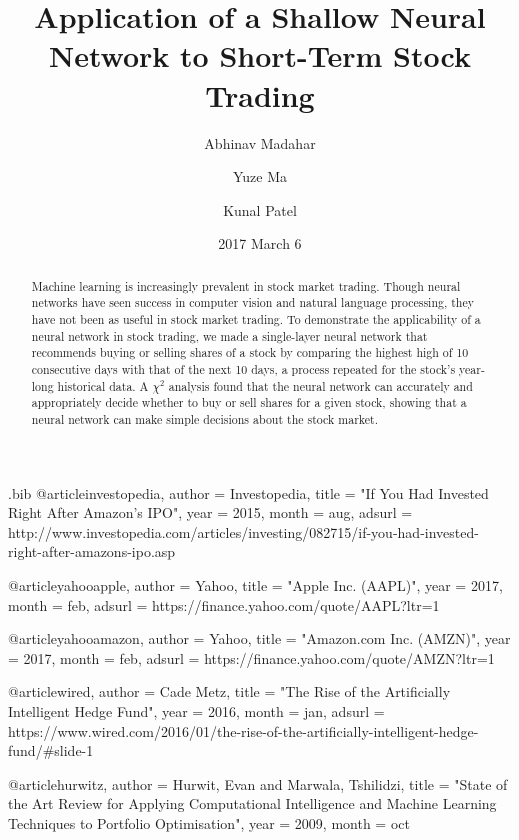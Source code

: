 \documentclass[twocolumn]{article}
\begin{document}
\begin{filecontents}{\jobname.bib}
@article{investopedia,
   author = {{Investopedia}},
    title = "{If You Had Invested Right After Amazon's IPO}",
     year = 2015,
    month = aug,
   adsurl = {http://www.investopedia.com/articles/investing/082715/if-you-had-invested-right-after-amazons-ipo.asp}
}

@article{yahooapple,
   author = {{Yahoo}},
    title = "{Apple Inc. (AAPL)}",
     year = 2017,
    month = feb,
   adsurl = {https://finance.yahoo.com/quote/AAPL?ltr=1}
}

@article{yahooamazon,
   author = {{Yahoo}},
    title = "{Amazon.com Inc. (AMZN)}",
     year = 2017,
    month = feb,
   adsurl = {https://finance.yahoo.com/quote/AMZN?ltr=1}
}

@article{wired,
   author = {{Cade Metz}},
    title = "{The Rise of the Artificially Intelligent Hedge Fund}",
     year = 2016,
    month = jan,
   adsurl = {https://www.wired.com/2016/01/the-rise-of-the-artificially-intelligent-hedge-fund/#slide-1}
}

@article{hurwitz,
   author = {Hurwit, Evan and Marwala, Tshilidzi},
    title = "{State of the Art Review for Applying Computational Intelligence and Machine Learning Techniques to Portfolio Optimisation}",
     year = 2009,
    month = oct
}
\end{filecontents}

\date{2017 March 6}

\title{Application of a Shallow Neural Network to Short-Term Stock Trading}

\author[1]{Abhinav Madahar}
\author[2]{Yuze Ma}
\author[3]{Kunal Patel}

\maketitle

\begin{abstract}
Machine learning is increasingly prevalent in stock market trading. Though neural networks have seen success in computer vision and natural language processing, they have not been as useful in stock market trading. To demonstrate the applicability of a neural network in stock trading, we made a single-layer neural network that recommends buying or selling shares of a stock by comparing the highest high of 10 consecutive days with that of the next 10 days, a process repeated for the stock's year-long historical data. A $\chi^2$ analysis found that the neural network can accurately and appropriately decide whether to buy or sell shares for a given stock, showing that a neural network can make simple decisions about the stock market.
\end{abstract}
\end{document}
